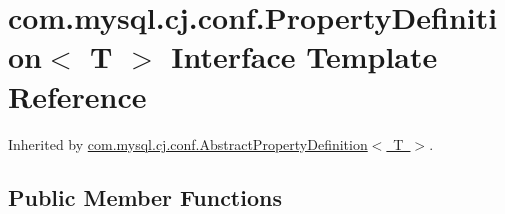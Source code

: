 \hypertarget{interfacecom_1_1mysql_1_1cj_1_1conf_1_1_property_definition}{}\section{com.\+mysql.\+cj.\+conf.\+Property\+Definition$<$ T $>$ Interface Template Reference}
\label{interfacecom_1_1mysql_1_1cj_1_1conf_1_1_property_definition}


Inherited by \mbox{\hyperlink{classcom_1_1mysql_1_1cj_1_1conf_1_1_abstract_property_definition}{com.\+mysql.\+cj.\+conf.\+Abstract\+Property\+Definition$<$ T $>$}}.

\subsection*{Public Member Functions}

